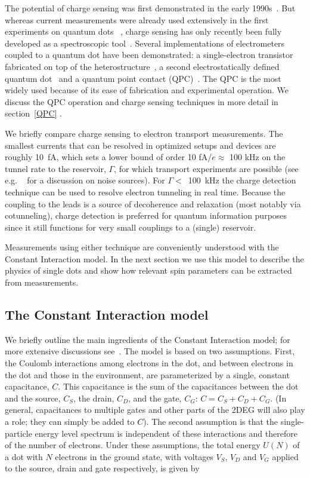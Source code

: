 \documentclass[rmp,twocolumn,aps]{revtex4}
\begin{document}
The potential of charge sensing was first demonstrated in the
early 1990s~\cite{AshooriPRL92,FieldPRL93}. But whereas current
measurements were already used extensively in the first
experiments on quantum dots ~\cite{Kouwenhoven97}, charge sensing
has only recently been fully developed as a spectroscopic
tool~\cite{ElzermanAPL2004,JohnsonPRB2005}. Several
implementations of electrometers coupled to a quantum dot have
been demonstrated: a single-electron transistor fabricated on top
of the heterostructure~\cite{AshooriPRL92,Lu03a}, a second
electrostatically defined quantum
dot~\cite{HoffmanPRB1995,Fujisawa04a} and a quantum point contact
(QPC)~\cite{FieldPRL93,Sprinzak2002}. The QPC is the most widely
used because of its ease of fabrication and experimental
operation. We discuss the QPC operation and charge sensing
techniques in more detail in section~\ref{QPC} .

We briefly compare charge sensing to electron transport
measurements. The smallest currents that can be resolved in optimized setups and devices are roughly
10~fA, which sets a lower bound of order 10 fA/$e \approx$ 100 kHz on the
tunnel rate to the reservoir, $\Gamma$, for which transport
experiments are possible (see e.g. ~\textcite{VandersypenAPL2004} for a discussion on noise sources). For $\Gamma<$~100~kHz the charge detection technique can be used to resolve electron tunneling in
real time. Because the coupling to the leads is a source of
decoherence and relaxation (most notably via cotunneling), charge
detection is preferred for quantum information purposes since it
still functions for very small couplings to a (single) reservoir.

Measurements using either technique are conveniently understood
with the Constant Interaction model. In the next section we
use this model to describe the physics of single dots and show
how relevant spin parameters can be extracted from measurements.

\subsection{The Constant Interaction model}
\label{CImodel}
We briefly outline the main ingredients of the Constant Interaction model; for more
extensive discussions see~\textcite{kouwenhoven01,Beenakker,Kouwenhoven97}. The model is
based on two assumptions. First, the Coulomb interactions among
electrons in the dot, and between electrons in the dot and those
in the environment, are parameterized by a single, constant
capacitance, $C$. This capacitance is the sum of the capacitances
between the dot and the source, $C_S$, the drain, $C_D$, and the
gate, $C_G$: $C = C_S + C_D + C_G$. (In general, capacitances to
multiple gates and other parts of the 2DEG will also play a role;
they can simply be added to $C$). The second assumption is that
the single-particle energy level spectrum is independent of these
interactions and therefore of the number of electrons. Under these
assumptions, the total energy $U(N)$ of a dot with $N$ electrons
in the ground state, with voltages $V_{S}$, $V_D$ and $V_G$
applied to  the source, drain and gate respectively, is given by
\end{document}
